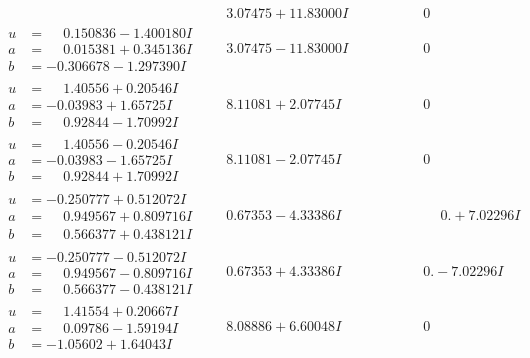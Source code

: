 \documentclass[1p]{elsarticle_modified}
\theoremstyle{definition}
\begin{document}
$$\begin{array}{c|c|c}
 & \phantom{-}3.07475 + 11.83000 I & \phantom{-0.000000 } 0 \\ \hline\begin{aligned}
u &= \phantom{-}0.150836 - 1.400180 I \\
a &= \phantom{-}0.015381 + 0.345136 I \\
b &= -0.306678 - 1.297390 I\end{aligned}
 & \phantom{-}3.07475 - 11.83000 I & \phantom{-0.000000 } 0 \\ \hline\begin{aligned}
u &= \phantom{-}1.40556 + 0.20546 I \\
a &= -0.03983 + 1.65725 I \\
b &= \phantom{-}0.92844 - 1.70992 I\end{aligned}
 & \phantom{-}8.11081 + 2.07745 I & \phantom{-0.000000 } 0 \\ \hline\begin{aligned}
u &= \phantom{-}1.40556 - 0.20546 I \\
a &= -0.03983 - 1.65725 I \\
b &= \phantom{-}0.92844 + 1.70992 I\end{aligned}
 & \phantom{-}8.11081 - 2.07745 I & \phantom{-0.000000 } 0 \\ \hline\begin{aligned}
u &= -0.250777 + 0.512072 I \\
a &= \phantom{-}0.949567 + 0.809716 I \\
b &= \phantom{-}0.566377 + 0.438121 I\end{aligned}
 & \phantom{-}0.67353 - 4.33386 I & \phantom{-0.000000 -}0. + 7.02296 I \\ \hline\begin{aligned}
u &= -0.250777 - 0.512072 I \\
a &= \phantom{-}0.949567 - 0.809716 I \\
b &= \phantom{-}0.566377 - 0.438121 I\end{aligned}
 & \phantom{-}0.67353 + 4.33386 I & \phantom{-0.000000 } 0. - 7.02296 I \\ \hline\begin{aligned}
u &= \phantom{-}1.41554 + 0.20667 I \\
a &= \phantom{-}0.09786 - 1.59194 I \\
b &= -1.05602 + 1.64043 I\end{aligned}
 & \phantom{-}8.08886 + 6.60048 I & \phantom{-0.000000 } 0 \\ \hline\begin{aligned}

\end{aligned}
\end{array}$$
\end{document}
